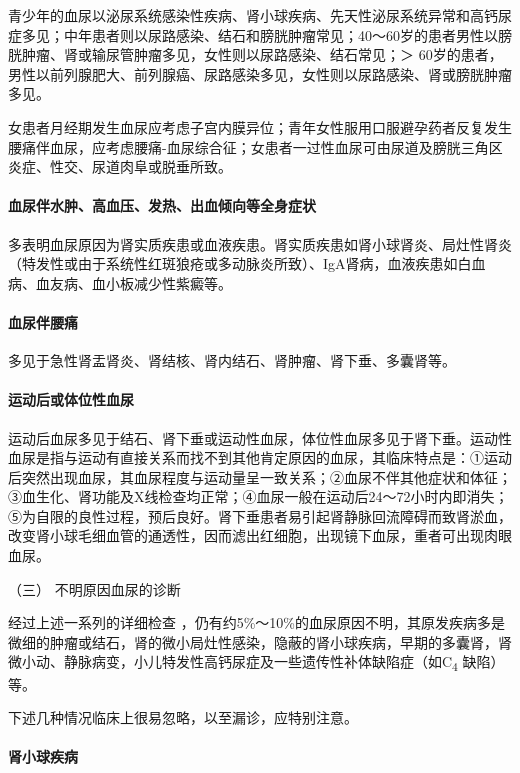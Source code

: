 青少年的血尿以泌尿系统感染性疾病、肾小球疾病、先天性泌尿系统异常和高钙尿症多见；中年患者则以尿路感染、结石和膀胱肿瘤常见；40～60岁的患者男性以膀胱肿瘤、肾或输尿管肿瘤多见，女性则以尿路感染、结石常见；＞
60岁的患者，男性以前列腺肥大、前列腺癌、尿路感染多见，女性则以尿路感染、肾或膀胱肿瘤多见。

女患者月经期发生血尿应考虑子宫内膜异位；青年女性服用口服避孕药者反复发生腰痛伴血尿，应考虑腰痛-血尿综合征；女患者一过性血尿可由尿道及膀胱三角区炎症、性交、尿道肉阜或脱垂所致。

\paragraph{血尿伴水肿、高血压、发热、出血倾向等全身症状}

多表明血尿原因为肾实质疾患或血液疾患。肾实质疾患如肾小球肾炎、局灶性肾炎（特发性或由于系统性红斑狼疮或多动脉炎所致）、IgA肾病，血液疾患如白血病、血友病、血小板减少性紫癜等。

\paragraph{血尿伴腰痛}

多见于急性肾盂肾炎、肾结核、肾内结石、肾肿瘤、肾下垂、多囊肾等。

\paragraph{运动后或体位性血尿}

运动后血尿多见于结石、肾下垂或运动性血尿，体位性血尿多见于肾下垂。运动性血尿是指与运动有直接关系而找不到其他肯定原因的血尿，其临床特点是：①运动后突然出现血尿，其血尿程度与运动量呈一致关系；②血尿不伴其他症状和体征；③血生化、肾功能及X线检查均正常；④血尿一般在运动后24～72小时内即消失；⑤为自限的良性过程，预后良好。肾下垂患者易引起肾静脉回流障碍而致肾淤血，改变肾小球毛细血管的通透性，因而滤出红细胞，出现镜下血尿，重者可出现肉眼血尿。

\hypertarget{text00037.htmlux5cux23CHP1-15-2-4-3}{}
（三） 不明原因血尿的诊断

经过上述一系列的详细检查
，仍有约5\%～10\%的血尿原因不明，其原发疾病多是微细的肿瘤或结石，肾的微小局灶性感染，隐蔽的肾小球疾病，早期的多囊肾，肾微小动、静脉病变，小儿特发性高钙尿症及一些遗传性补体缺陷症（如C\textsubscript{4}
缺陷）等。

下述几种情况临床上很易忽略，以至漏诊，应特别注意。

\paragraph{肾小球疾病}

